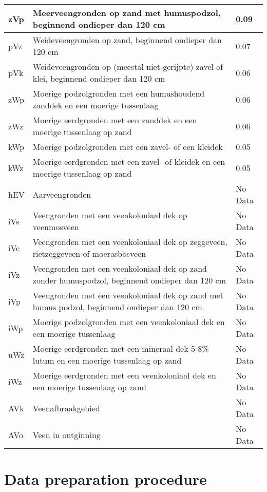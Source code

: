 {\begin{appendices}
\begin{center}
\begin{longtable}{|l| p{11cm} | l |}
zVp & Meerveengronden op zand met humuspodzol, beginnend ondieper dan 120 cm & 0.09 \\ \hline
pVz & Weideveengronden op zand, beginnend ondieper dan 120 cm  & 0.07 \\ \hline
pVk & Weideveengronden op (meestal niet-gerijpte) zavel of klei, beginnend ondieper dan 120 cm  & 0.06 \\ \hline
zWp & Moerige podzolgronden met een humushoudend zanddek en een moerige tussenlaag  & 0.06 \\ \hline
zWz & Moerige eerdgronden met een zanddek en een moerige tussenlaag op zand  & 0.06 \\ \hline
kWp & Moerige podzolgronden met een zavel- of een kleidek  & 0.05 \\ \hline
kWz & Moerige eerdgronden met een zavel- of kleidek en een moerige tussenlaag op zand  & 0.05 \\ \hline
hEV & Aarveengronden  & \multicolumn{1}{l|}{No Data} \\ \hline
iVs & Veengronden met een veenkoloniaal dek op veenmosveen & \multicolumn{1}{l|}{No Data} \\ \hline
iVc & Veengronden met een veenkoloniaal dek op zeggeveen, rietzeggeveen of moerasbosveen  & \multicolumn{1}{l|}{No Data} \\ \hline
iVz & Veengronden met een veenkoloniaal dek op zand zonder humuspodzol, beginnend ondieper dan 120 cm  & \multicolumn{1}{l|}{No Data} \\ \hline
iVp & Veengronden met een veenkoloniaal dek op zand met humus podzol, beginnend ondieper dan 120 cm  & \multicolumn{1}{l|}{No Data} \\ \hline
iWp & Moerige podzolgronden met een veenkoloniaal dek en een moerige tussenlaag  & \multicolumn{1}{l|}{No Data} \\ \hline
uWz & Moerige eerdgronden met een mineraal dek 5-8\% lutum en een moerige tussenlaag op zand  & \multicolumn{1}{l|}{No Data} \\ \hline
iWz & Moerige eerdgronden met een veenkoloniaal dek en een moerige tussenlaag op zand  & \multicolumn{1}{l|}{No Data} \\ \hline
AVk & Veenafbraakgebied & \multicolumn{1}{l|}{No Data} \\ \hline
AVo & Veen in ontginning & \multicolumn{1}{l|}{No Data} \\ \hline
\end{longtable}
\end{center}

\chapter{Data preparation procedure}  \label{ann:procdataprep}


\end{appendices}}
